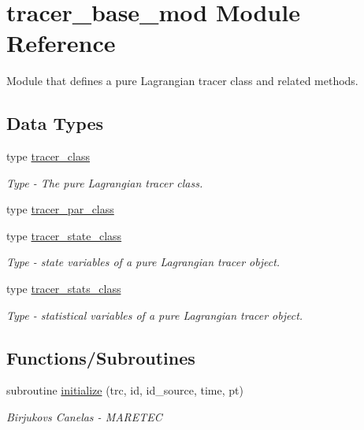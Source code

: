 \hypertarget{namespacetracer__base__mod}{}\section{tracer\+\_\+base\+\_\+mod Module Reference}
\label{namespacetracer__base__mod}


Module that defines a pure Lagrangian tracer class and related methods.  


\subsection*{Data Types}
\begin{DoxyCompactItemize}
\item 
type \hyperlink{structtracer__base__mod_1_1tracer__class}{tracer\+\_\+class}
\begin{DoxyCompactList}\small\item\em Type -\/ The pure Lagrangian tracer class. \end{DoxyCompactList}\item 
type \hyperlink{structtracer__base__mod_1_1tracer__par__class}{tracer\+\_\+par\+\_\+class}
\item 
type \hyperlink{structtracer__base__mod_1_1tracer__state__class}{tracer\+\_\+state\+\_\+class}
\begin{DoxyCompactList}\small\item\em Type -\/ state variables of a pure Lagrangian tracer object. \end{DoxyCompactList}\item 
type \hyperlink{structtracer__base__mod_1_1tracer__stats__class}{tracer\+\_\+stats\+\_\+class}
\begin{DoxyCompactList}\small\item\em Type -\/ statistical variables of a pure Lagrangian tracer object. \end{DoxyCompactList}\end{DoxyCompactItemize}
\subsection*{Functions/\+Subroutines}
\begin{DoxyCompactItemize}
\item 
subroutine \hyperlink{namespacetracer__base__mod_ae73e3d1fd8818cf3e1a8593aafebea43}{initialize} (trc, id, id\+\_\+source, time, pt)
\begin{DoxyCompactList}\small\item\em Birjukovs Canelas -\/ M\+A\+R\+E\+T\+EC \end{DoxyCompactList}\end{DoxyCompactItemize}

